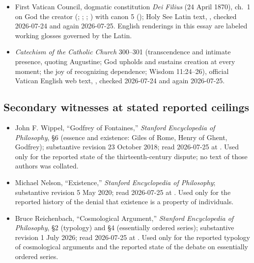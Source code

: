 {\fontsize{8.6}{9.6}\selectfont
\begin{itemize}[itemsep=0pt,parsep=0pt,topsep=0.05em]
\item First Vatican Council, dogmatic constitution \emph{Dei Filius} (24 April 1870), ch.~1 on God the creator (; ; ; ) with canon 5  (); Holy See Latin text, , checked 2026-07-24 and again 2026-07-25. English renderings in this essay are labeled working glosses governed by the Latin.
\item \emph{Catechism of the Catholic Church} 300--301 (transcendence and intimate presence, quoting Augustine; God upholds and sustains creation at every moment; the joy of recognizing dependence; Wisdom 11:24--26), official Vatican English web text, , checked 2026-07-24 and again 2026-07-25.
\end{itemize}}

\subsection*{Secondary witnesses at stated reported ceilings}

{\fontsize{8.6}{9.6}\selectfont
\begin{itemize}[itemsep=0pt,parsep=0pt,topsep=0.05em]
\item John F. Wippel, ``Godfrey of Fontaines,'' \emph{Stanford Encyclopedia of Philosophy}, §6 (essence and existence: Giles of Rome, Henry of Ghent, Godfrey); substantive revision 23 October 2018; read 2026-07-25 at . Used only for the reported state of the thirteenth-century dispute; no text of those authors was collated.
\item Michael Nelson, ``Existence,'' \emph{Stanford Encyclopedia of Philosophy}; substantive revision 5 May 2020; read 2026-07-25 at . Used only for the reported history of the denial that existence is a property of individuals.
\item Bruce Reichenbach, ``Cosmological Argument,'' \emph{Stanford Encyclopedia of Philosophy}, §2 (typology) and §4 (essentially ordered series); substantive revision 1 July 2026; read 2026-07-25 at . Used only for the reported typology of cosmological arguments and the reported state of the debate on essentially ordered series.
\end{itemize}}

\endgroup

